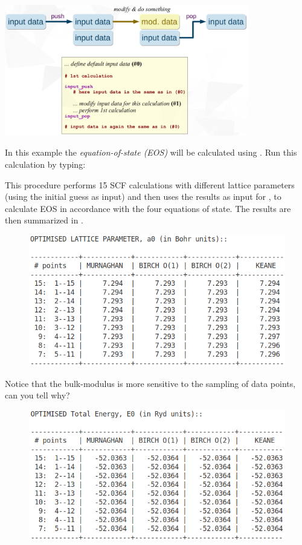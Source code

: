 \documentclass[landscape]{foils}
\begin{document}
\centerline{\includegraphics[width=0.8\textwidth]{figs/i-data-stacking.png}}


In this example the {\em equation-of-state (EOS)} will be calculated
using . Run this calculation by typing:


This procedure performs 15 SCF calculations with different lattice
parameters (using the initial guess as input) and then uses the
results as input for , to calculate EOS in accordance with
the four equations of state. The results are then summarized in
.

\begin{figure}
\centering
\includegraphics[width=15.0cm]{figs/LATTICE_PARAMETERS.png}
\end{figure}

Notice that the bulk-modulus is more sensitive to the sampling of
data points, can you tell why?
 
\begin{figure}
\centering
\includegraphics[width=15.0cm]{figs/TOTAL_ENERGY.png}
\end{figure}
\end{document}

